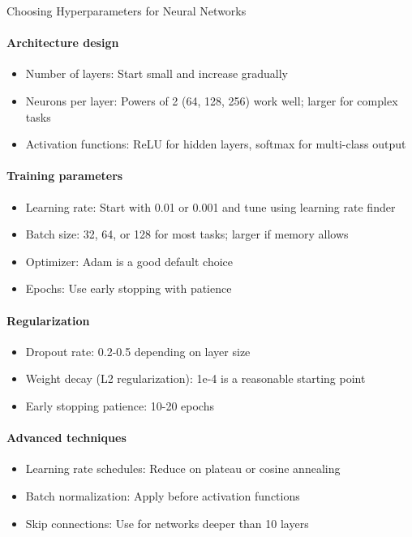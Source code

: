 \begin{KR}{Choosing Hyperparameters for Neural Networks}
\paragraph{Architecture design}
\begin{itemize}
    \item Number of layers: Start small and increase gradually
    \item Neurons per layer: Powers of 2 (64, 128, 256) work well; larger for complex tasks
    \item Activation functions: ReLU for hidden layers, softmax for multi-class output
\end{itemize}

\paragraph{Training parameters}
\begin{itemize}
    \item Learning rate: Start with 0.01 or 0.001 and tune using learning rate finder
    \item Batch size: 32, 64, or 128 for most tasks; larger if memory allows
    \item Optimizer: Adam is a good default choice
    \item Epochs: Use early stopping with patience
\end{itemize}

\paragraph{Regularization}
\begin{itemize}
    \item Dropout rate: 0.2-0.5 depending on layer size
    \item Weight decay (L2 regularization): 1e-4 is a reasonable starting point
    \item Early stopping patience: 10-20 epochs
\end{itemize}

\paragraph{Advanced techniques}
\begin{itemize}
    \item Learning rate schedules: Reduce on plateau or cosine annealing
    \item Batch normalization: Apply before activation functions
    \item Skip connections: Use for networks deeper than 10 layers
\end{itemize}
\end{KR}

